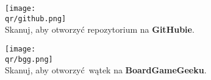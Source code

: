 \bigbreak

\begin{multicols}{2}
\centering
\texttt{[image: \\qr/github.png]}\\
Skanuj, aby otworzyć repozytorium na \textbf{GitHubie}.

\columnbreak

\texttt{[image: \\qr/bgg.png]}\\
Skanuj, aby otworzyć wątek na \textbf{BoardGameGeeku}.
\end{multicols}
